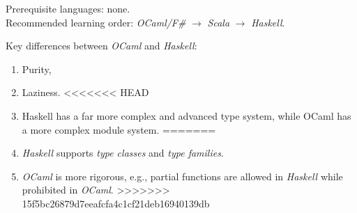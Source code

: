 \documentclass{article}
\begin{document}
\begin{itemize}
    Prerequisite languages: none.\\
    Recommended learning order:
    \emph{OCaml/F\#} $\rightarrow$ \emph{Scala} $\rightarrow$ \emph{Haskell}.
    
    Key differences between \emph{OCaml} and \emph{Haskell}:
    \begin{enumerate}
        \item Purity,
        \item Laziness.
<<<<<<< HEAD
        \item Haskell has a far more complex and advanced type system, while OCaml has a more complex module system.
=======
        \item \emph{Haskell} supports \emph{type classes} and \emph{type families}.
        \item \emph{OCaml} is more rigorous, e.g., partial functions are allowed in \emph{Haskell} while prohibited in \emph{OCaml}.
>>>>>>> 15f5bc26879d7eeafcfa4c1cf21deb16940139db
    \end{enumerate}
    

\end{itemize}
\end{document}
